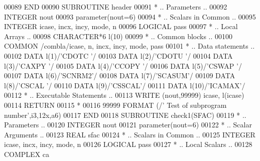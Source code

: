 \begin{DoxyCode}
00089 \textcolor{keyword}{      END}
00090 \textcolor{keyword}{      SUBROUTINE }header
00091 \textcolor{comment}{*     .. Parameters ..}
00092       \textcolor{keywordtype}{INTEGER}          nout
00093       parameter(nout=6)
00094 \textcolor{comment}{*     .. Scalars in Common ..}
00095       \textcolor{keywordtype}{INTEGER}          icase, incx, incy, mode, n
00096       \textcolor{keywordtype}{LOGICAL}          pass
00097 \textcolor{comment}{*     .. Local Arrays ..}
00098       \textcolor{keywordtype}{CHARACTER*6}      l(10)
00099 \textcolor{comment}{*     .. Common blocks ..}
00100       \textcolor{keyword}{COMMON}           /combla/icase, n, incx, incy, mode, pass
00101 \textcolor{comment}{*     .. Data statements ..}
00102       \textcolor{keyword}{DATA}             l(1)/\textcolor{stringliteral}{'CDOTC '}/
00103       \textcolor{keyword}{DATA}             l(2)/\textcolor{stringliteral}{'CDOTU '}/
00104       \textcolor{keyword}{DATA}             l(3)/\textcolor{stringliteral}{'CAXPY '}/
00105       \textcolor{keyword}{DATA}             l(4)/\textcolor{stringliteral}{'CCOPY '}/
00106       \textcolor{keyword}{DATA}             l(5)/\textcolor{stringliteral}{'CSWAP '}/
00107       \textcolor{keyword}{DATA}             l(6)/\textcolor{stringliteral}{'SCNRM2'}/
00108       \textcolor{keyword}{DATA}             l(7)/\textcolor{stringliteral}{'SCASUM'}/
00109       \textcolor{keyword}{DATA}             l(8)/\textcolor{stringliteral}{'CSCAL '}/
00110       \textcolor{keyword}{DATA}             l(9)/\textcolor{stringliteral}{'CSSCAL'}/
00111       \textcolor{keyword}{DATA}             l(10)/\textcolor{stringliteral}{'ICAMAX'}/
00112 \textcolor{comment}{*     .. Executable Statements ..}
00113       \textcolor{keyword}{WRITE} (nout,99999) icase, l(icase)
00114       \textcolor{keywordflow}{RETURN}
00115 \textcolor{comment}{*}
00116 99999 \textcolor{keyword}{FORMAT} (/\textcolor{stringliteral}{' Test of subprogram number'},i3,12x,a6)
00117 \textcolor{keyword}{      END}
00118 \textcolor{keyword}{      SUBROUTINE }check1(SFAC)
00119 \textcolor{comment}{*     .. Parameters ..}
00120       \textcolor{keywordtype}{INTEGER}           nout
00121       parameter(nout=6)
00122 \textcolor{comment}{*     .. Scalar Arguments ..}
00123       \textcolor{keywordtype}{REAL}              sfac
00124 \textcolor{comment}{*     .. Scalars in Common ..}
00125       \textcolor{keywordtype}{INTEGER}           icase, incx, incy, mode, n
00126       \textcolor{keywordtype}{LOGICAL}           pass
00127 \textcolor{comment}{*     .. Local Scalars ..}
00128       \textcolor{keywordtype}{COMPLEX}           ca

\end{DoxyCode}
